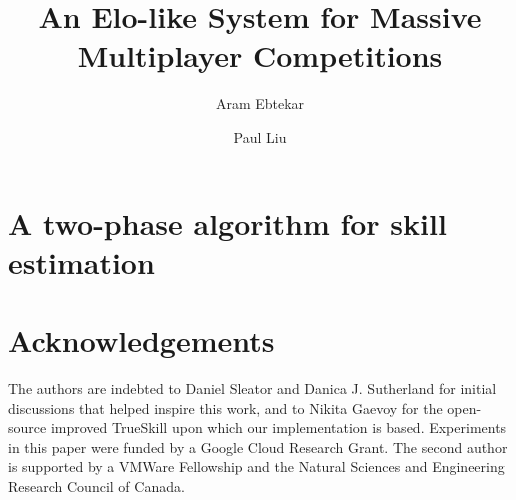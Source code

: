 \documentclass[sigconf]{acmart}
\title{An Elo-like System for Massive Multiplayer Competitions}
\author{Aram Ebtekar}
\affiliation{%
  \city{Vancouver}
  \state{BC}
  \country{Canada}
}
\author{Paul Liu}
\affiliation{%
  \institution{Stanford University}
  \city{Stanford}
  \state{CA}
  \country{USA}
}
\date{}
\begin{document}


\maketitle
\pagestyle{plain}



\section{A two-phase algorithm for skill estimation}
\label{sec:main-alg}
    
    
    






\section*{Acknowledgements}
The authors are indebted to Daniel Sleator and Danica J. Sutherland for initial discussions that helped inspire this work, and to Nikita Gaevoy for the open-source improved TrueSkill upon which our implementation is based. Experiments in this paper were funded by a Google Cloud Research Grant. The second author is supported by a VMWare Fellowship and the Natural Sciences and Engineering Research Council of Canada.

\appendix




\end{document}
